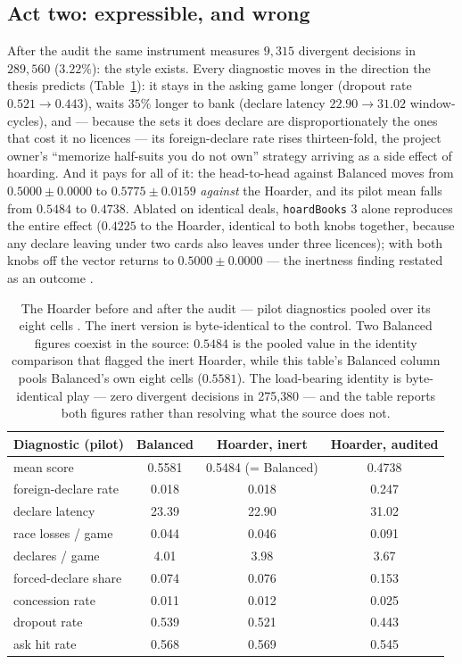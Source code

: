 \documentclass[11pt]{article}
\newcommand{\code}[1]{\texttt{#1}}
\begin{document}
\subsection{Act two: expressible, and wrong}

After the audit the same instrument measures $9{,}315$ divergent decisions in $289{,}560$
($3.22\%$): the style exists. Every diagnostic moves in the direction the thesis predicts
(Table~\ref{tab:hoarderpilot}): it stays in the asking game longer (dropout rate $0.521 \to
0.443$), waits $35\%$ longer to bank (declare latency $22.90 \to 31.02$ window-cycles), and --- because the sets
it does declare are disproportionately the ones that cost it no licences --- its
foreign-declare rate rises thirteen-fold, the project owner's ``memorize half-suits you do not
own'' strategy arriving as a side effect of hoarding. And it pays for all of it: the
head-to-head against Balanced moves from $0.5000 \pm 0.0000$ to $0.5775 \pm 0.0159$
\emph{against} the Hoarder, and its pilot mean falls from $0.5484$ to $0.4738$. Ablated on
identical deals, \code{hoardBooks} 3 alone reproduces the entire effect ($0.4225$ to the
Hoarder, identical to both knobs together, because any declare leaving under two cards also
leaves under three licences); with both knobs off the vector returns to $0.5000 \pm 0.0000$
--- the inertness finding restated as an outcome \cite{styles}.

\begin{table}[t]
\centering
\caption{The Hoarder before and after the audit --- pilot diagnostics pooled over its eight
cells \cite{styles}. The inert version is byte-identical to the control. Two Balanced figures
coexist in the source: $0.5484$ is the pooled value in the identity comparison that flagged the
inert Hoarder, while this table's Balanced column pools Balanced's own eight cells ($0.5581$).
The load-bearing identity is byte-identical play --- zero divergent decisions in 275{,}380 ---
and the table reports both figures rather than resolving what the source does not.}
\label{tab:hoarderpilot}
\footnotesize
\begin{tabular}{@{}lccc@{}}
\toprule
Diagnostic (pilot) & Balanced & Hoarder, inert & Hoarder, audited \\
\midrule
mean score            & 0.5581 & 0.5484 (= Balanced) & 0.4738 \\
foreign-declare rate  & 0.018  & 0.018  & 0.247 \\
declare latency       & 23.39  & 22.90  & 31.02 \\
race losses / game    & 0.044  & 0.046  & 0.091 \\
declares / game       & 4.01   & 3.98   & 3.67 \\
forced-declare share  & 0.074  & 0.076  & 0.153 \\
concession rate       & 0.011  & 0.012  & 0.025 \\
dropout rate          & 0.539  & 0.521  & 0.443 \\
ask hit rate          & 0.568  & 0.569  & 0.545 \\
\bottomrule
\end{tabular}
\end{table}
\end{document}
